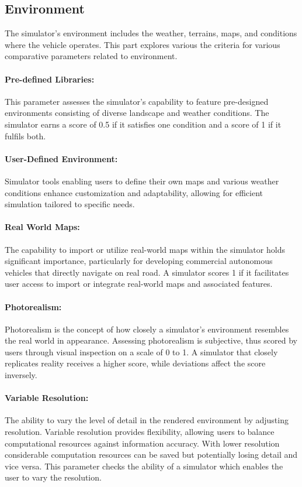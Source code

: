 \documentclass[12pt,twoside,a4paper,parskip]{scrbook} %
\begin{document}
\subsection{Environment}
The simulator's environment includes the weather, terrains, maps, and conditions where the vehicle operates. This part explores various the criteria for various comparative parameters related to environment. 
\paragraph*{Pre-defined Libraries:}
This parameter assesses the simulator's capability to feature pre-designed environments consisting of diverse landscape and weather conditions. The simulator earns a score of 0.5 if it satisfies one condition and a score of 1 if it fulfils both.
\paragraph*{User-Defined Environment:}
Simulator tools enabling users to define their own maps and various weather conditions enhance customization and adaptability, allowing for efficient simulation tailored to specific needs.
\paragraph*{Real World Maps:}
The capability to import or utilize real-world maps within the simulator holds significant importance, particularly for developing commercial autonomous vehicles that directly navigate on real road. A simulator scores 1 if it facilitates user access to import or integrate real-world maps and associated features.
\paragraph*{Photorealism:}
Photorealism is the concept of how closely a simulator's environment resembles the real world in appearance. Assessing photorealism is subjective, thus scored by users through visual inspection on a scale of 0 to 1. A simulator that closely replicates reality receives a higher score, while deviations affect the score inversely.
\paragraph*{Variable Resolution:}
The ability to vary the level of detail in the rendered environment by adjusting resolution. Variable resolution provides flexibility, allowing users to balance computational resources against information accuracy. With lower resolution considerable computation resources can be saved but potentially losing detail and vice versa. This parameter checks the ability of a simulator which enables the user to vary the resolution.
\end{document}

